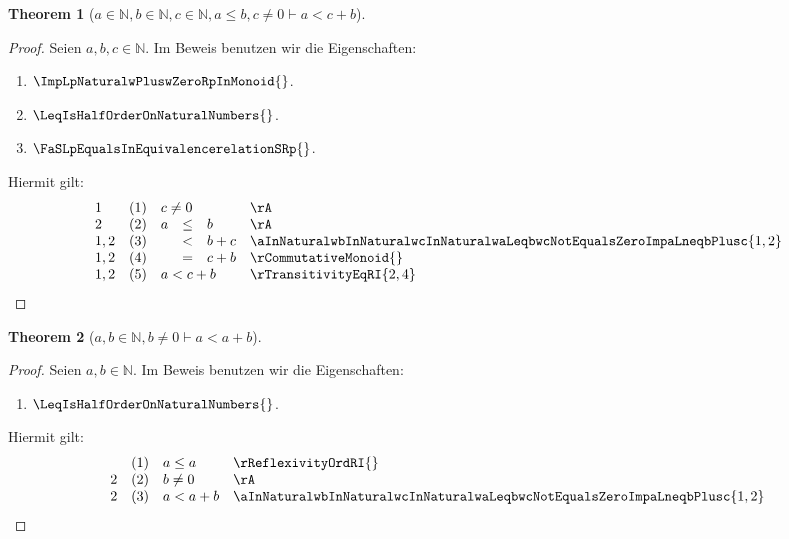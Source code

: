 \documentclass{book}
\theoremstyle{plain}
\newtheorem{theorem}{Theorem}
\theoremstyle{remark}
\theoremstyle{definition}
\begin{document}
\label{aInNaturalwbInNaturalwcInNaturalwaLeqbwcNotEqualsZeroImpaLneqcPlusb}
\begin{theorem}[\(a\in\mathbb{N},b\in\mathbb{N},c\in\mathbb{N}, a\leq b,c\neq 0 \vdash a<c+b\)]
\end{theorem}
\begin{proof}
        Seien \(a,b,c\in\mathbb{N}\). Im Beweis benutzen wir die Eigenschaften:
\begin{enumerate}
    \item \(\ImpLpNaturalwPluswZeroRpInMonoid{}\).
    \item \(\LeqIsHalfOrderOnNaturalNumbers{}\).
    \item \(\FaSLpEqualsInEquivalencerelationSRp{}\).
\end{enumerate}
Hiermit gilt:
\[
\begin{array}{llclll}
            1 & (1) & \multicolumn{3}{l}{c\neq 0}  & \rA \\
            2 & (2) & a&\leq &b  & \rA  \\
            1,2 & (3) & &<&b+c  &  \aInNaturalwbInNaturalwcInNaturalwaLeqbwcNotEqualsZeroImpaLneqbPlusc{1,2} \\
            1,2 & (4) & &= &c+b  &  \rCommutativeMonoid{} \\
            1,2 & (5) & \multicolumn{3}{l}{a<c+b} & \rTransitivityEqRI{2,4} \\
\end{array}
\]
\end{proof}

\label{awbInNaturalwbNotEqualsZeroImpaLneqaPlusb}
\begin{theorem}[\(a,b\in\mathbb{N},b\neq 0\vdash a<a+b\)]
\end{theorem}
\begin{proof}
        Seien \(a,b\in\mathbb{N}\). Im Beweis benutzen wir die Eigenschaften:
\begin{enumerate}
    \item \(\LeqIsHalfOrderOnNaturalNumbers{}\).
\end{enumerate}
Hiermit gilt:
\[
\begin{array}{llll}
              & (1) & a\leq a  & \rReflexivityOrdRI{} \\
            2 & (2) & b\neq 0  & \rA \\
            2 & (3) & a<a+b & \aInNaturalwbInNaturalwcInNaturalwaLeqbwcNotEqualsZeroImpaLneqbPlusc{1,2} \\
\end{array}
\]
\end{proof}
\end{document}
